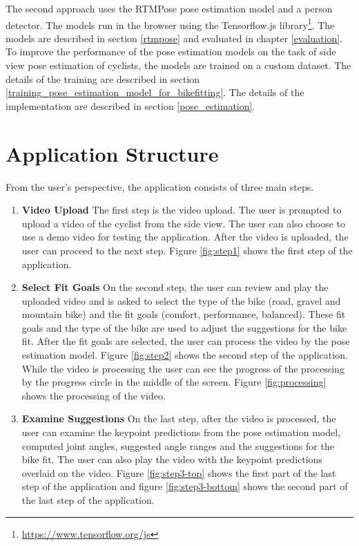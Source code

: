 The second approach uses the RTMPose pose estimation model and a person detector. The models run in the browser using the Tensorflow.js library\footnote{\url{https://www.tensorflow.org/js}}. The models are described in section \ref{rtmpose} and evaluated in chapter \ref{evaluation}. To improve the performance of the pose estimation models on the task of side view pose estimation of cyclists, the models are trained on a custom dataset. The details of the training are described in section \ref{training_pose_estimation_model_for_bikefitting}. The details of the implementation are described in section \ref{pose_estimation}.

\section{Application Structure}
From the user's perspective, the application consists of three main steps.

\begin{enumerate}
    \item \textbf{Video Upload} The first step is the video upload. The user is prompted to upload a video of the cyclist from the side view. The user can also choose to use a demo video for testing the application. After the video is uploaded, the user can proceed to the next step. Figure \ref{fig:step1} shows the first step of the application.

    \item \textbf{Select Fit Goals}  On the second step, the user can review and play the uploaded video and is asked to select the type of the bike (road, gravel and mountain bike) and the fit goals (comfort, performance, balanced). These fit goals and the type of the bike are used to adjust the suggestions for the bike fit. After the fit goals are selected, the user can process the video by the pose estimation model. Figure \ref{fig:step2} shows the second step of the application. While the video is processing the user can see the progress of the processing by the progress circle in the middle of the screen. Figure \ref{fig:processing} shows the processing of the video.

    \item \textbf{Examine Suggestions} On the last step, after the video is processed, the user can examine the keypoint predictions from the pose estimation model, computed joint angles, suggested angle ranges and the suggestions for the bike fit. The user can also play the video with the keypoint predictions overlaid on the video. Figure \ref{fig:step3-top} shows the first part of the last step of the application and figure \ref{fig:step3-bottom} shows the second part of the last step of the application.
\end{enumerate}

